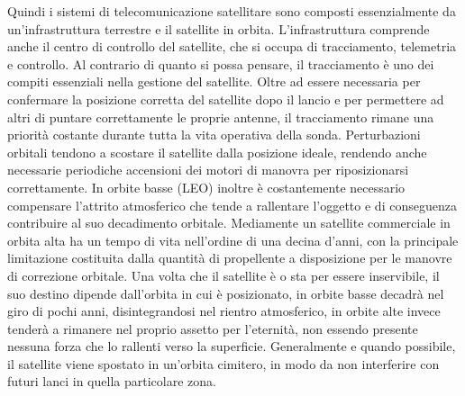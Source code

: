 \documentclass[a4paper]{article}
\begin{document}
			Quindi i sistemi di telecomunicazione satellitare sono composti essenzialmente da un'infrastruttura terrestre e il satellite in orbita. L'infrastruttura comprende anche il centro di controllo del satellite, che si occupa di tracciamento, telemetria e controllo. Al contrario di quanto si possa pensare, il tracciamento è uno dei compiti essenziali nella gestione del satellite. Oltre ad essere necessaria per confermare la posizione corretta del satellite dopo il lancio e per permettere ad altri di puntare correttamente le proprie antenne, il tracciamento rimane una priorità costante durante tutta la vita operativa della sonda. Perturbazioni orbitali tendono a scostare il satellite dalla posizione ideale, rendendo anche necessarie periodiche accensioni dei motori di manovra per riposizionarsi correttamente. In orbite basse (LEO) inoltre è costantemente necessario compensare l'attrito atmosferico che tende a rallentare l'oggetto e di conseguenza contribuire al suo decadimento orbitale. 
			Mediamente un satellite commerciale in orbita alta ha un tempo di vita nell'ordine di una decina d'anni, con la principale limitazione costituita dalla quantità di propellente a disposizione per le manovre di correzione orbitale. Una volta che il satellite è o sta per essere inservibile, il suo destino dipende dall'orbita in cui è posizionato, in orbite basse decadrà nel giro di pochi anni, disintegrandosi nel rientro atmosferico, in orbite alte invece tenderà a rimanere nel proprio assetto per l'eternità, non essendo presente nessuna forza che lo rallenti verso la superficie. Generalmente e quando possibile, il satellite viene spostato in un'orbita cimitero, in modo da non interferire con futuri lanci in quella particolare zona. 
			
			
\end{document}
